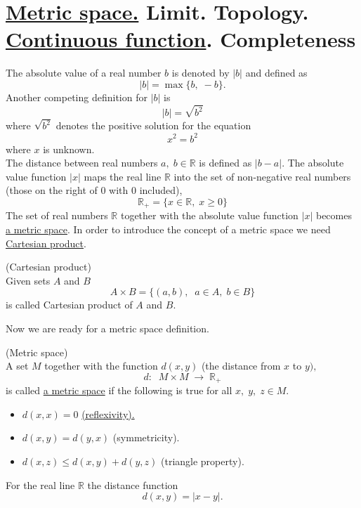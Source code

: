 \documentclass[color=black,11pt]{elegantpaper}
\begin{document}
\section{\href{https://en.wikipedia.org/wiki/Metric_space}{Metric space.} Limit. Topology. \href{https://en.wikipedia.org/wiki/Continuous_function}{Continuous function}. Completeness}
\label{sec:Metric}
The absolute value  of a real number $b$ is denoted by $|b|$ and defined as
$$
|b| = \max\{b,\;-b\}.
$$ 
Another competing definition for $|b|$ is
$$
|b| = \sqrt{b^2}
$$
where $\sqrt{b^2}$ denotes the positive solution for the equation
$$
x^2 = b^2
$$
where $x$ is unknown.\\

The distance between real numbers $a,\;b\in \mathbb{R}$ is defined as $|b-a|.$ The absolute value function $|x|$ maps the real line $\mathbb{R}$ into the set of non-negative real numbers (those on the right of $0$ with $0$ included),
$$
\mathbb{R}_+ = \{x\in \mathbb{R},\;x\ge 0 \}
$$ 
The set of real numbers $\mathbb{R}$ together with the absolute value function $|x|$ becomes \href{https://en.wikipedia.org/wiki/Metric_space}{a metric space}. In order to introduce the concept of a metric space we need \href{https://en.wikipedia.org/wiki/Cartesian_product}{Cartesian product}.
\begin{definition} (Cartesian product)\\
\label{def:Cartesian}
Given sets $A$ and $B$ 
$$
A\times B = \{(a,b),\;\;a\in A,\; b\in B\}
$$ 
is called Cartesian product of $A$ and $B.$
\end{definition}
Now we are ready for a metric space definition.
\pagebreak
\begin{definition} (Metric space)\\
\label{def:SpaceMetric}
A set $M$ together with the function $d(x,y)$ (the distance from $x$ to $y),$
$$
d:\;\;M \times M \;\to \; \mathbb{R}_+
$$
is called \href{https://en.wikipedia.org/wiki/Metric_space}{a metric space} if the following is true for all $x,\;y,\;z\in M.$ 
\begin{itemize}
\item[] $d(x,x) = 0$ \href{https://en.wikipedia.org/wiki/Reflexive_relation}{(reflexivity).}
\item[] $d(x,y)=d(y,x)$ (symmetricity).
\item[] $d(x,z)\le d(x,y)+d(y,z)$ (triangle property).
\end{itemize}
\end{definition}
For the real line $\mathbb{R}$ the distance function
$$
d(x,y) = |x-y|.
$$
\end{document}
